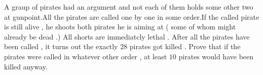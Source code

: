 A graup of pirates had an argument and not each of them holds some other two at gunpoint.All the pirates are called one by one in some order.If the called pirate is still alive , he shoots both pirates  he is aiming at ( some of whom might already be dead .) All shorts are immediatcly  lethal .  After all the pirates have been called , it turns out the exactly $28$ pirates got killed . Prove that if the pirates  were called in whatever other order , at least $10$ pirates would have been killed anyway.